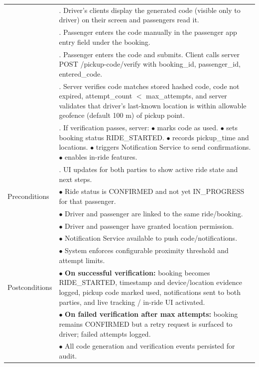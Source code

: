\begin{longtable}{|>{\raggedright\arraybackslash}p{4cm}|>{\raggedright\arraybackslash}p{11cm}|}
& 4. Driver’s clients display the generated code (visible only to driver) on their screen and passengers read it. \\
& 5. Passenger enters the code manually in the passenger app entry field under the booking. \\
& 6. Passenger enters the code and submits. Client calls server POST /pickup-code/verify with booking\_id, passenger\_id, entered\_code. \\
& 7. Server verifies code matches stored hashed code, code not expired, attempt\_count $<$ max\_attempts, and server validates that driver’s last-known location is within allowable geofence (default 100 m) of pickup point. \\
& 8. If verification passes, server: \newline $\bullet$ marks code as used. \newline $\bullet$ sets booking status RIDE\_STARTED. \newline $\bullet$ records pickup\_time and locations. \newline $\bullet$ triggers Notification Service to send confirmations. \newline $\bullet$ enables in-ride features. \\
& 9. UI updates for both parties to show active ride state and next steps. \\
\hline
Preconditions & $\bullet$ Ride status is CONFIRMED and not yet IN\_PROGRESS for that passenger. \\
& $\bullet$ Driver and passenger are linked to the same ride/booking. \\
& $\bullet$ Driver and passenger have granted location permission. \\
& $\bullet$ Notification Service available to push code/notifications. \\
& $\bullet$ System enforces configurable proximity threshold and attempt limits. \\
\hline
Postconditions & $\bullet$ \textbf{On successful verification:} booking becomes RIDE\_STARTED, timestamp and device/location evidence logged, pickup code marked used, notifications sent to both parties, and live tracking / in-ride UI activated. \\
& $\bullet$ \textbf{On failed verification after max attempts:} booking remains CONFIRMED but a retry request is surfaced to driver; failed attempts logged. \\
& $\bullet$ All code generation and verification events persisted for audit. \\

\end{longtable}
